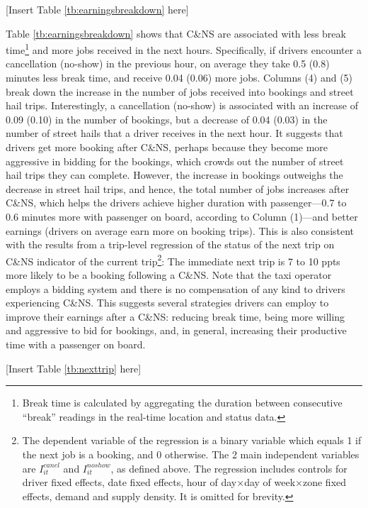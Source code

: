 \documentclass[reviewmode]{restud}
\begin{document}
\begin{center}
	[Insert Table \ref{tb:earningsbreakdown} here]
\end{center}

Table \ref{tb:earningsbreakdown} shows that C\&NS are associated with less break time\footnote{Break time is calculated by aggregating the duration between consecutive ``break'' readings in the real-time location and status data.} and more jobs received in the next hours. Specifically, if drivers encounter a cancellation (no-show) in the previous hour, on average they take 0.5 (0.8) minutes less break time, and receive 0.04 (0.06) more jobs. Columns (4) and (5) break down the increase in the number of jobs received into bookings and street hail trips. Interestingly, a cancellation (no-show) is associated with an increase of 0.09 (0.10) in the number of bookings, but a decrease of 0.04 (0.03) in the number of street hails that a driver receives in the next hour. It suggests that drivers get more booking after C\&NS, perhaps because they become more aggressive in bidding for the bookings, which crowds out the number of street hail trips they can complete. However, the increase in bookings outweighs the decrease in street hail trips, and hence, the total number of jobs increases after C\&NS, which helps the drivers achieve higher duration with passenger---0.7 to 0.6 minutes more with passenger on board, according to Column (1)---and better earnings (drivers on average earn more on booking trips). This is also consistent with the results from a trip-level regression of the status of the next trip on C\&NS indicator of the current trip\footnote{The dependent variable of the regression is a binary variable which equals 1 if the next job is a booking, and 0 otherwise. The 2 main independent variables are $I_{it}^{canel}$ and $I_{it}^{noshow}$, as defined above. The regression includes controls for driver fixed effects, date fixed effects, hour of day\(\times\)day of week\(\times\)zone fixed effects, demand and supply density. It is omitted for brevity.}: The immediate next trip is 7 to 10 ppts more likely to be a booking following a C\&NS. Note that the taxi operator employs a bidding system and there is no compensation of any kind to drivers experiencing C\&NS. 
This suggests several strategies drivers can employ to improve their earnings after a C\&NS: reducing break time, being more willing and aggressive to bid for bookings, and, in general, increasing their productive time with a passenger on board.

\begin{center}
	[Insert Table \ref{tb:nexttrip} here]
\end{center}
\end{document}

